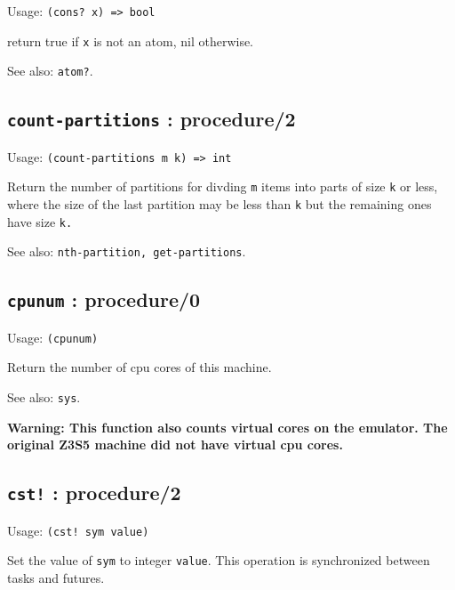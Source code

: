 \documentclass[
]{article}
\newcommand{\passthrough}[1]{#1}
\begin{document}
Usage: \passthrough{\lstinline!(cons? x) => bool!}

return true if \passthrough{\lstinline!x!} is not an atom, nil
otherwise.

See also: \passthrough{\lstinline!atom?!}.

\hypertarget{count-partitions-procedure2-1}{%
\subsection{\texorpdfstring{\texttt{count-partitions} :
procedure/2}{count-partitions : procedure/2}}\label{count-partitions-procedure2-1}}

Usage: \passthrough{\lstinline!(count-partitions m k) => int!}

Return the number of partitions for divding \passthrough{\lstinline!m!}
items into parts of size \passthrough{\lstinline!k!} or less, where the
size of the last partition may be less than \passthrough{\lstinline!k!}
but the remaining ones have size \passthrough{\lstinline!k.!}

See also: \passthrough{\lstinline!nth-partition, get-partitions!}.

\hypertarget{cpunum-procedure0-1}{%
\subsection{\texorpdfstring{\texttt{cpunum} :
procedure/0}{cpunum : procedure/0}}\label{cpunum-procedure0-1}}

Usage: \passthrough{\lstinline!(cpunum)!}

Return the number of cpu cores of this machine.

See also: \passthrough{\lstinline!sys!}.

\textbf{Warning: This function also counts virtual cores on the
emulator. The original Z3S5 machine did not have virtual cpu cores.}

\hypertarget{cst-procedure2-1}{%
\subsection{\texorpdfstring{\texttt{cst!} :
procedure/2}{cst! : procedure/2}}\label{cst-procedure2-1}}

Usage: \passthrough{\lstinline"(cst! sym value)"}

Set the value of \passthrough{\lstinline!sym!} to integer
\passthrough{\lstinline!value!}. This operation is synchronized between
tasks and futures.
\end{document}
